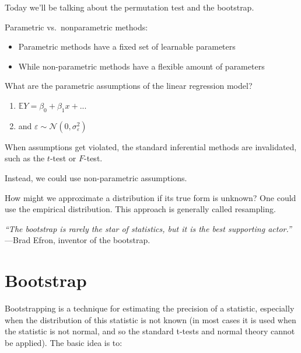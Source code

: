 \documentclass[
  letterpaper,
  DIV=11,
  numbers=noendperiod]{scrreport}
\providecommand{\tightlist}{%
  \setlength{\itemsep}{0pt}\setlength{\parskip}{0pt}}\usepackage{longtable,booktabs,array}
\begin{document}
Today we'll be talking about the {permutation test} and the {bootstrap}.

Parametric vs.~nonparametric methods:

\begin{itemize}
\tightlist
\item
  Parametric methods have a fixed set of learnable parameters
\item
  While non-parametric methods have a flexible amount of parameters
\end{itemize}

What are the parametric assumptions of the linear regression model?

\begin{enumerate}
\def\labelenumi{\arabic{enumi}.}
\tightlist
\item
  \(\mathbb E Y = \beta_0 + \beta_1 x + ...\)
\item
  and \(\varepsilon \sim \mathcal N(0, \sigma^2_{\varepsilon})\)
\end{enumerate}

When assumptions get violated, the standard inferential methods are
invalidated, such as the \(t\)-test or \(F\)-test.

Instead, we could use non-parametric assumptions.

How might we approximate a distribution if its true form is unknown? One
could use the empirical distribution. This approach is generally called
{resampling}.

\emph{``The bootstrap is rarely the star of statistics, but it is the
best supporting actor.''} ---Brad Efron, inventor of the bootstrap.

\hypertarget{bootstrap-1}{%
\section{Bootstrap}\label{bootstrap-1}}

Bootstrapping is a technique for estimating the precision of a
statistic, especially when the distribution of this statistic is not
known (in most cases it is used when the statistic is not normal, and so
the standard t-tests and normal theory cannot be applied). The basic
idea is to:
\end{document}
